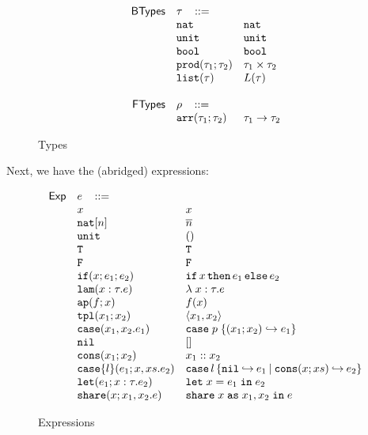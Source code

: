 \documentclass{easychair}
\newcommand{\ms}[1]{\ensuremath{\mathsf{#1}}}
\newcommand{\irl}[1]{\mathtt{#1}}
\newcommand{\paircaseabt}[4]{\irl{case}(#2,#3.#4)}
\newcommand{\paircasecst}[4]{\irl{case} \; #1\; \{(#2;#3) \hookrightarrow #4\}}
\newcommand{\sharecst}[4]{\irl{share}\;#1\;\irl{as}\;#2,#3\;\irl{in}\;#4}
\newcommand{\shareabt}[4]{\irl{share}(#1;#2,#3.#4)}
\theoremstyle{definition}
\begin{document}
\begin{wrapfigure}{l}{0.5\textwidth}

	\[
\begin{array}{r l l l}
\ms{BTypes} & \tau \,\,\,\,\, ::= \\
	& \irl{nat}                	 			& \irl{nat}											\\
	& \unittyabt                	 			& \unittycst								\\
  & \booltyabt                       & \booltycst                \\
  & \prodtyabt{\tau_1}{\tau_2}       & \prodtycst{\tau_1}{\tau_2}\\
  &\listtyabt{\tau}		& L(\tau)				\\						
  \\
\ms{FTypes} & \rho \,\,\,\,\, ::= \\
	&\irl{arr}(\tau_1;\tau_2) 				& \arrtycst{\tau_1}{\tau_2}\\ 	
\end{array}
\]
			\caption{Types}
\label{fig:types}
\end{wrapfigure}

Next, we have the (abridged) expressions: 
\begin{wrapfigure}{r}{0.5\textwidth}
	\vspace{-20pt}
\[
\begin{array}{r l l l}
\ms{Exp}
        & e   \,\,\,\,\, ::= \\
 	& x                                			& x 											\\	
  & \irl{nat}[n]							& \numeral{n}											\\	
  & \irl{unit}							& ()											\\	
  & \irl{T}							& \irl{T}											\\	
  & \irl{F}	   					& \irl{F}											\\	
  & \ifexabt{x}{e_1}{e_2} & \ifexcst{x}{e_1}{e_2} \\ 
  & \irl{lam}(x:\tau.e) 						&\lambda \; x : \tau. e 	\\	
  & \irl{ap}(f;x) 					& \appcst{f}{x} 									\\	
  & \irl{tpl}(x_1;x_2)     	& \pairexcst{x_1}{x_2}                								\\	
 	& \paircaseabt{p}{x_1}{x_2}{e_1}					& \paircasecst{p}{x_1}{x_2}{e_1}   \\	
 	& \nilexabt					& []   									\\	
 	& \consexabt{x_1}{x_2}					& x_1::x_2   									\\	
 	& \listcaseexabt{l}{e_1}{x}{xs}{e_2}					& \listcaseexcst{l}{e_1}{x}{xs}{e_2}   \\	
  & \irl{let}(e_1; x : \tau.e_2)			& \irl{let}\; x = e_1 \; \irl{in}\; e_2   \\	
  & \shareabt{x}{x_1}{x_2}{e} &\sharecst{x}{x_1}{x_2}{e}\\ 
\end{array}
\]
				\vspace{-10pt}
			\caption{Expressions}
		\vspace{-10pt}
\label{fig:exp}
\end{wrapfigure}
\end{document}
